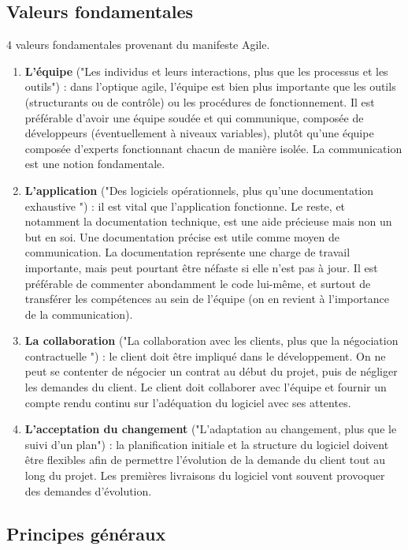 \subsection{Valeurs fondamentales}
4 valeurs fondamentales provenant du manifeste Agile. 

\begin{enumerate}
\item \textbf{L'équipe} ("Les individus et leurs interactions, plus que les processus et les outils") : dans l'optique agile, l'équipe est bien plus importante que les outils (structurants ou de contrôle) ou les procédures de fonctionnement. Il est préférable d'avoir une équipe soudée et qui communique, composée de développeurs (éventuellement à niveaux variables), plutôt qu'une équipe composée d'experts fonctionnant chacun de manière isolée. La communication est une notion fondamentale.
\item \textbf{L'application} ("Des logiciels opérationnels, plus qu'une documentation exhaustive ") : il est vital que l'application fonctionne. Le reste, et notamment la documentation technique, est une aide précieuse mais non un but en soi. Une documentation précise est utile comme moyen de communication. La documentation représente une charge de travail importante, mais peut pourtant être néfaste si elle n'est pas à jour. Il est préférable de commenter abondamment le code lui-même, et surtout de transférer les compétences au sein de l'équipe (on en revient à l'importance de la communication).
\item \textbf{La collaboration} ("La collaboration avec les clients, plus que la négociation contractuelle ") : le client doit être impliqué dans le développement. On ne peut se contenter de négocier un contrat au début du projet, puis de négliger les demandes du client. Le client doit collaborer avec l'équipe et fournir un compte rendu continu sur l'adéquation du logiciel avec ses attentes.
\item \textbf{L'acceptation du changement} ("L'adaptation au changement, plus que le suivi d'un plan") : la planification initiale et la structure du logiciel doivent être flexibles afin de permettre l'évolution de la demande du client tout au long du projet. Les premières livraisons du logiciel vont souvent provoquer des demandes d'évolution.
\end{enumerate}

\subsection{Principes généraux}

